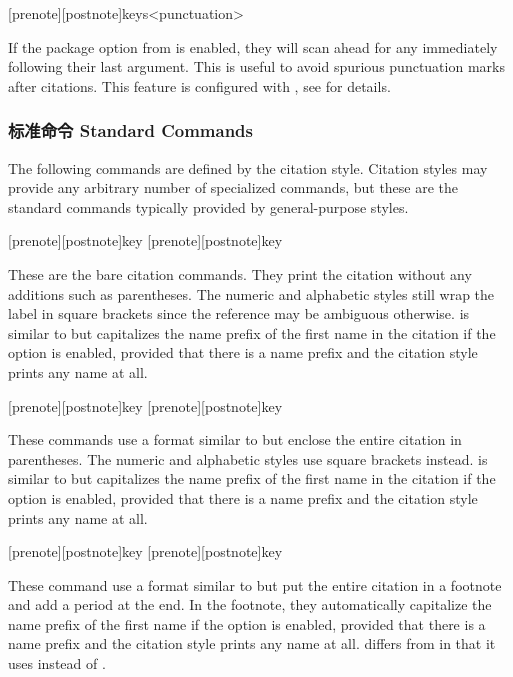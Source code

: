 \begin{ltxsyntax}

[prenote][postnote]{keys}<punctuation>

If the  package option from  is enabled, they will scan ahead for any  immediately following their last argument. This is useful to avoid spurious punctuation marks after citations. This feature is configured with , see  for details.

\end{ltxsyntax}

\subsubsection{标准命令 Standard Commands}
\label{use:cit:std}

The following commands are defined by the citation style. Citation styles may provide any arbitrary number of specialized commands, but these are the standard commands typically provided by general-purpose styles.

\begin{ltxsyntax}

[prenote][postnote]{key}
[prenote][postnote]{key}

These are the bare citation commands. They print the citation without any additions such as parentheses. The numeric and alphabetic styles still wrap the label in square brackets since the reference may be ambiguous otherwise.  is similar to  but capitalizes the name prefix of the first name in the citation if the  option is enabled, provided that there is a name prefix and the citation style prints any name at all.

[prenote][postnote]{key}
[prenote][postnote]{key}

These commands use a format similar to  but enclose the entire citation in parentheses. The numeric and alphabetic styles use square brackets instead.  is similar to  but capitalizes the name prefix of the first name in the citation if the  option is enabled, provided that there is a name prefix and the citation style prints any name at all.

[prenote][postnote]{key}
[prenote][postnote]{key}

These command use a format similar to  but put the entire citation in a footnote and add a period at the end. In the footnote, they automatically capitalize the name prefix of the first name if the  option is enabled, provided that there is a name prefix and the citation style prints any name at all.  differs from  in that it uses  instead of .

\end{ltxsyntax}

